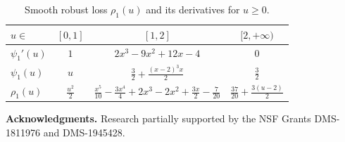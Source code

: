 \documentclass[11pt]{amsart}
\numberwithin{equation}{section}
\numberwithin{equation}{section}
\begin{document}
{\begin{table}[ht]
\caption[Huber loss and its derivatives, as well as its smoothed version $\rho_0$]{Huber loss $\rho_H(u)$ and its derivatives, as well as its smoothed version
    $\rho_0(u)$ and its derivatives.
    In the plots, the loss $\rho$
    is shown in brown,
    $\psi=\rho'$ in red
    and $\psi'$ in blue.
}
\label{table:rho_0}
\end{table}
\begin{table}[ht]
    \centering
\small
\begin{tabular}{@{}|l|c|c|c|@{}}
\toprule
$u\in$ & $[0,1]$ & $[1,2]$ & $[2,+\infty)$ \\ \midrule
$\psi_1'(u)$ & $1$  & $2x^3 - 9x^2 + 12x - 4$  & $0$ \\ \midrule
$\psi_1(u)$ & $u$  & $\frac 3 2  + \frac{(x-2)^3x}{2}$ & $\frac{3}{2}$  \\ \midrule
$\rho_1(u)$  & $\frac{u^2}{2}$ & $\frac{x^5}{10} -\frac{3x^4}{4} + 2x^3-2x^2 + \frac{3x}{2}-\frac{7}{20}$  &  $\frac{37}{20} + \frac{3(u-2)}{2}$  \\ \bottomrule
\end{tabular}

\caption[Smoothed version $\rho_1$ of the Huber loss]{Smooth robust loss $\rho_1(u)$ and its derivatives for $u\ge 0$.
}
\label{table:rho_1}
\end{table}
}




%

\textbf{Acknowledgments.}
Research partially supported by the NSF Grants DMS-1811976 and 
DMS-1945428.



%
%
%

\end{document}
